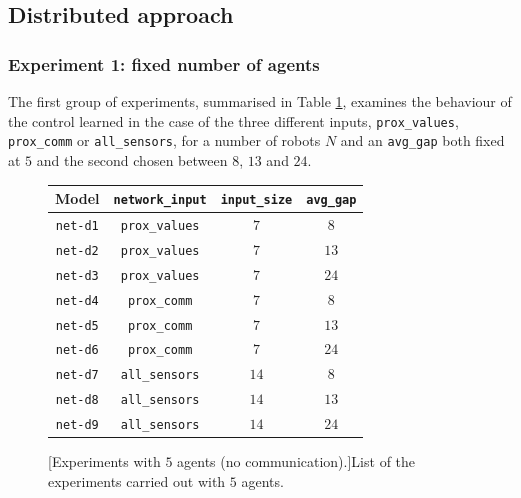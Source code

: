 \subsection{Distributed approach}
\label{subsec:task1-exp-distr}

\subsubsection{Experiment 1: fixed number of agents}
\label{subsubsec:task1-exp-distr-1}

The first group of experiments, summarised in Table \ref{tab:modeln5dist}, 
examines the behaviour of the control learned in the case of the three different 
inputs, \texttt{prox\_values}, \texttt{prox\_comm} or \texttt{all\_sensors}, for a 
number of robots $N$ and an \texttt{avg\_gap} both fixed at $5$ and the second 
chosen between $8$, $13$ and $24$.
\begin{figure}[!htb]
	\centering
	\begin{tabular}{cccc}
		\toprule
		\textbf{Model} \quad & \textbf{\texttt{network\_input}} & 
		\textbf{\texttt{input\_size}} &
		\textbf{\texttt{avg\_gap}} \\
		\midrule
		\texttt{net-d1} 				 & \texttt{prox\_values}	&  $  7$  &  $  8$  \\
		\texttt{net-d2} 				& \texttt{prox\_values}	    &  $  7$  &  $13$ \\
		\texttt{net-d3} 				& \texttt{prox\_values}	    &  $  7$  &  $24$  \\
		\texttt{net-d4} 				 & \texttt{prox\_comm}	  &  $  7$  &  $  8$  \\
		\texttt{net-d5} 				 & \texttt{prox\_comm}	  &  $  7$  &  $13$  \\
		\texttt{net-d6} 				 & \texttt{prox\_comm}	  &  $  7$  &  $24$  \\
		\texttt{net-d7} 				 & \texttt{all\_sensors}	  &  $14$  &  $  8$  \\
		\texttt{net-d8} 				 & \texttt{all\_sensors}	  &  $14$  &  $13$ 	\\
		\texttt{net-d9} 				 & \texttt{all\_sensors}	  &  $14$  &  $24$ 	\\
		\bottomrule
	\end{tabular}
	[Experiments with $5$ agents (no communication).]{List of the 
	experiments carried out with $5$ agents.}
	\label{tab:modeln5dist}
\end{figure}

